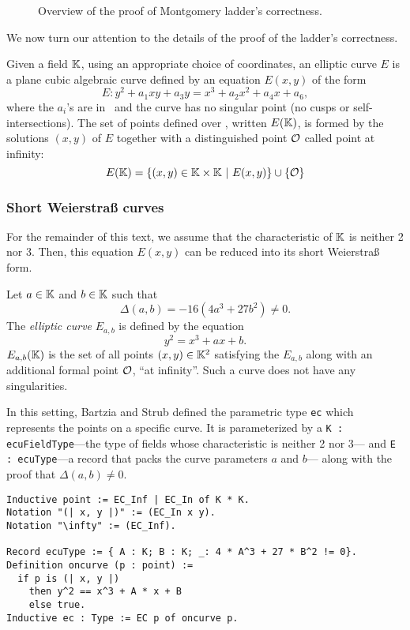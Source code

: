 \begin{figure}[h]
  \centering
  
  \caption{Overview of the proof of Montgomery ladder's correctness.}
  \label{tikz:ProofHighLevel1}
\end{figure}

We now turn our attention to the details of the proof of the ladder's correctness.

\begin{dfn}
  Given a field $\mathbb{K}$,
  using an appropriate choice of coordinates,
  an elliptic curve $E$
  is a plane cubic algebraic curve defined by an equation $E(x,y)$ of the form
  $$E : y^2 + a_1 xy + a_3 y = x^3 + a_2 x^2 + a_4 x + a_6,$$
  where the $a_i$'s are in \K\ and the curve has no singular point (\ie no cusps
  or self-intersections). The set of points defined over \K, written $E(\mathbb{K})$, is formed by the
  solutions $(x,y)$ of $E$ together with a distinguished point $\mathcal{O}$ called point at infinity:
  $$E(\mathbb{K}) = \{ (x,y) \in \mathbb{K} \times \mathbb{K} ~|~E(x,y)\} \cup \{\mathcal{O}\}$$
\end{dfn}

\subsubsection{Short Weierstra{\ss} curves}
\label{subsec:ECC-Weierstrass}

For the remainder of this text, we assume that the characteristic of $\mathbb{K}$ is neither 2 nor 3.
Then, this equation $E(x,y)$ can be reduced into its short Weierstra{\ss} form.

\begin{dfn}
  Let $a \in \mathbb{K}$ and $b \in \mathbb{K}$ such that $$\Delta(a,b) = -16(4a^3 + 27b^2) \neq 0.$$
  The \textit{elliptic curve} $E_{a,b}$ is defined by the equation
  $$y^2 = x^3 + ax + b.$$
  $E_{a,b}(\mathbb{K})$ is the set of all points $(x,y) \in \mathbb{K}^2$ satisfying the $E_{a,b}$
  along with an additional formal point $\mathcal{O}$, ``at infinity''. Such a curve does not have any singularities.
\end{dfn}

In this setting, Bartzia and Strub defined the parametric type \texttt{ec} which
represents the points on a specific curve. It is parameterized by
a \texttt{K : ecuFieldType}---the type of fields whose characteristic is neither 2 nor 3---%
and \texttt{E : ecuType}---a record that packs the curve parameters $a$ and $b$---%
along with the proof that $\Delta(a,b) \neq 0$.
\begin{lstlisting}[language=Coq]
Inductive point := EC_Inf | EC_In of K * K.
Notation "(| x, y |)" := (EC_In x y).
Notation "\infty" := (EC_Inf).

Record ecuType := { A : K; B : K; _: 4 * A^3 + 27 * B^2 != 0}.
Definition oncurve (p : point) :=
  if p is (| x, y |)
    then y^2 == x^3 + A * x + B
    else true.
Inductive ec : Type := EC p of oncurve p.
\end{lstlisting}

